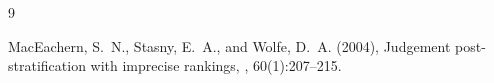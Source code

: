 \documentclass[twoside]{article}
\begin{document}
\begin{thebibliography}{9}

MacEachern, S.~N., Stasny, E.~A., and Wolfe, D.~A. (2004),
\newblock Judgement post-stratification with imprecise rankings,
, 60(1):207--215.

%
%
%
%
%
%
%

\end{thebibliography}
\end{document}
